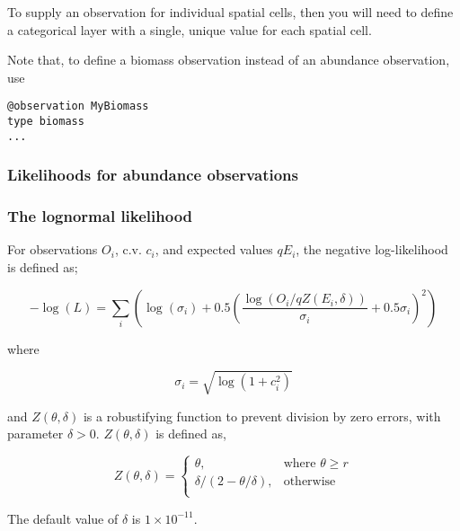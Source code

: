 {{{{{{To supply an observation for individual spatial cells, then you will need to define a categorical layer with a single, unique value for each spatial cell. 

Note that, to define a biomass observation instead of an abundance observation, use 

{\small{\begin{verbatim}
@observation MyBiomass
type biomass
...
\end{verbatim}}}

\subsubsection{Likelihoods for abundance observations}

\subsubsection*{The lognormal likelihood}

For observations $O_i$, c.v. $c_i$, and expected values $qE_i$, the negative log-likelihood is defined as;

\begin{equation}
 - \log \left(L \right) = \sum\limits_i \left( \log \left( \sigma _i \right) + 0.5\left( \frac{\log \left(O_i / q Z \left(E_i,\delta \right) \right)}{\sigma_i} + 0.5 \sigma_i \right)^2 \right)
\end{equation}

where 

\begin{equation}
  \sigma_i  = \sqrt{\log \left(1+c_i^2 \right)}
\end{equation}

and $Z \left(\theta,\delta \right)$ is a robustifying function to prevent division by zero errors, with parameter $\delta>0$. $Z \left(\theta,\delta \right)$ is defined as,

\begin{equation}
   Z \left(\theta,\delta \right) = \begin{cases}
	  \theta, & \text{where $\theta \ge r$} \\
	  \delta/\left( 2-\theta/\delta \right), & \text{otherwise} \\  
  \end{cases}
\end{equation}

The default value of $\delta$ is $1 \times 10^{-11}$.

}}}}}}
